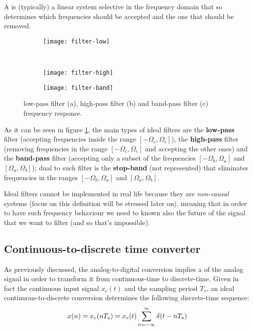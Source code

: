 			A  is (typically) a linear system selective in the frequency domain that so determines which frequencies should be accepted and the one that should be removed.
			
			\begin{figure}[b]
				\centering 
				\begin{subfigure}{0.48\linewidth}
					\centering \texttt{[image: filter-low]} \caption{}
				\end{subfigure} \\
				\begin{subfigure}{0.48\linewidth}
					\centering \texttt{[image: filter-high]} \caption{}
				\end{subfigure}			
				\begin{subfigure}{0.48\linewidth}
					\centering \texttt{[image: filter-band]} \caption{}
				\end{subfigure}
				\caption{low-pass filter (a), high-pass filter (b) and band-pass filter (c) frequency response.} \label{fig:conv:idealfilters}
			\end{figure}
			
			As it can be seen in figure \ref{fig:conv:idealfilters}, the main types of ideal filters are the \textbf{low-pass} filter (accepting frequencies inside the range $[-\Omega_c,\Omega_c]$), the \textbf{high-pass} filter (removing frequencies in the range $[-\Omega_c,\Omega_c]$ and accepting the other ones) and the \textbf{band-pass} filter (accepting only a subset of the frequencies $[-\Omega_b,\Omega_a]$ and $[\Omega_a,\Omega_b]$); dual to such filter is the \textbf{stop-band} (not represented) that eliminates frequencies in the ranges $[-\Omega_b,\Omega_a]$ and $[\Omega_a,\Omega_b]$.
			
			Ideal filters cannot be implemented in real life because they are \textit{non-causal} systems  (focus on this definition will be stressed later on), meaning that in order to have such frequency behaviour we need to known also the future of the signal that we want to filter (and so that's impossible).			
		
		\subsection{Continuous-to-discrete time converter} \label{sec:conv:timeconversion}
			
			As previously discussed, the analog-to-digital conversion implies a  of the analog signal in order to transform it from continuous-time to discrete-time. Given in fact the continuous input signal $x_c(t)$ and the sampling period $T_s$, an ideal continuous-to-discrete conversion determines the following discrete-time sequence:
			\begin{equation}
				x(n) = x_c(nT_s) = x_c(t) \sum_{n=-\infty}^\infty \delta(t-nT_s)
			\end{equation}
			
